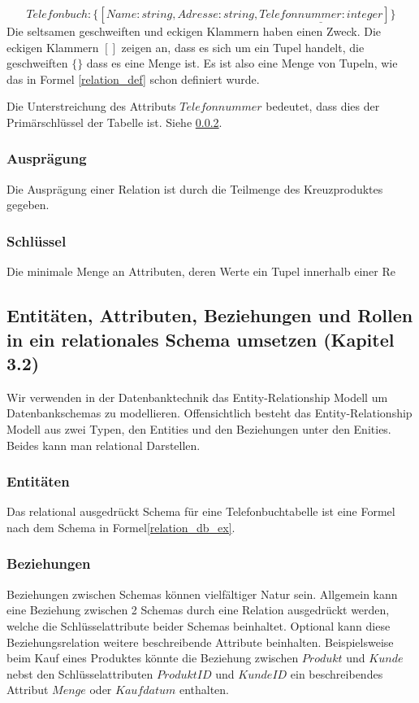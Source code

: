 \begin{equation}
    Telefonbuch : \{[Name: string, Adresse: string, \underline{Telefonnummer:integer} ]\}
\end{equation}
Die seltsamen geschweiften und eckigen Klammern haben einen Zweck. Die eckigen Klammern \([ ]\) zeigen an, dass es sich um ein Tupel handelt, die geschweiften \(\{ \}\) dass es eine Menge ist. Es ist also eine Menge von Tupeln, wie das in Formel \eqref{relation_def} schon definiert wurde.

Die Unterstreichung des Attributs \(Telefonnummer\) bedeutet, dass dies der Primärschlüssel der Tabelle ist. Siehe \ref{sec:primary_key_def}.

\subsubsection{Ausprägung}
Die Ausprägung einer Relation ist durch die Teilmenge des Kreuzproduktes gegeben.

\subsubsection{Schlüssel}\label{sec:primary_key_def}
Die minimale Menge an Attributen, deren Werte ein Tupel innerhalb einer Re

\subsection{Entitäten, Attributen, Beziehungen und Rollen in ein relationales Schema umsetzen (Kapitel 3.2)}

Wir verwenden in der Datenbanktechnik das Entity-Relationship Modell um Datenbankschemas zu modellieren.
Offensichtlich besteht das Entity-Relationship Modell aus zwei Typen, den Entities und den Beziehungen unter den Enities. Beides kann man relational Darstellen. 

\subsubsection{Entitäten}
Das relational ausgedrückt Schema für eine Telefonbuchtabelle ist eine Formel nach dem Schema in Formel\eqref{relation_db_ex}.

\subsubsection{Beziehungen}
Beziehungen zwischen Schemas können vielfältiger Natur sein. Allgemein kann eine Beziehung zwischen 2 Schemas durch eine Relation ausgedrückt werden, welche die Schlüsselattribute beider Schemas beinhaltet. Optional kann diese Beziehungsrelation weitere beschreibende Attribute beinhalten. Beispielsweise beim Kauf eines Produktes könnte die Beziehung zwischen \(Produkt\) und \(Kunde\) nebst den Schlüsselattributen \(ProduktID\) und \(KundeID\) ein beschreibendes Attribut \(Menge\) oder \(Kaufdatum\) enthalten. 

